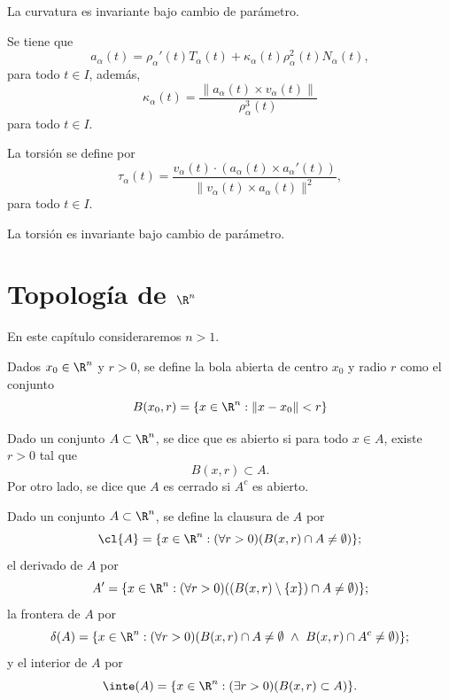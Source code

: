 \documentclass[a4,11pt]{aleph-notas}
\begin{document}
\begin{prop}
    La curvatura es invariante bajo cambio de parámetro.
\end{prop}

\begin{prop}
    Se tiene que
    \[
        a_\alpha(t)=\rho_\alpha'(t) T_\alpha(t) + \kappa_\alpha(t) \rho^2_\alpha(t) N_\alpha(t),
    \]
    para todo $t\in I$, además,
    \[
        \kappa_\alpha(t) = \frac{\|a_\alpha(t)\times v_\alpha(t)\|}{\rho^3_\alpha(t)}
    \]
    para todo $t\in I$.
\end{prop}

\begin{defi}[Torsión]
    La torsión se define por
    \[
        \tau_\alpha(t)= \frac{v_\alpha(t)\cdot(a_\alpha(t)\times a_\alpha'(t))}{\| v_\alpha(t)\times a_\alpha(t) \|^2},
    \]
    para todo $t\in I$.
\end{defi}

\begin{prop}
    La torsión es invariante bajo cambio de parámetro.
\end{prop}

\section{Topología de $\R^n$}


En este capítulo consideraremos $n>1$.

\begin{defi}
    Dados $x_0\in\R^n$ y $r>0$, se define la bola abierta de centro $x_0$ y radio $r$ como el conjunto
    \[
        B(x_0,r)=\{x\in\R^n : \|x-x_0\|<r\}
    \]
    
\end{defi}

\begin{defi}
    Dado un conjunto $A\subset \R^n$, se dice que es abierto si para todo $x\in A$, existe $r>0$ tal que
    \[
        B(x,r)\subset A.
    \]
    Por otro lado, se dice que $A$ es cerrado si $A^c$ es abierto.
\end{defi}

\begin{defi}
    Dado un conjunto $A\subset \R^n$, se define la clausura de $A$ por
    \[
        \cl{A}=\{x\in \R^n: (\forall r>0)(B(x,r)\cap A\neq \emptyset)\};
    \]
    el derivado de $A$ por
    \[
        A'=\{x\in \R^n: (\forall r>0)((B(x,r)\setminus\{x\})\cap A\neq \emptyset)\};
    \]
    la frontera de $A$ por
    \[
        \delta(A)=\{x\in \R^n: (\forall r>0)(B(x,r)\cap A\neq \emptyset\ \land\ B(x,r)\cap A^c\neq \emptyset) \};
    \]
    y el interior de $A$ por
    \[
        \inte(A)=\{x\in \R^n: (\exists r>0)(B(x,r)\subset A)\}.
    \]
\end{defi}
\end{document}
